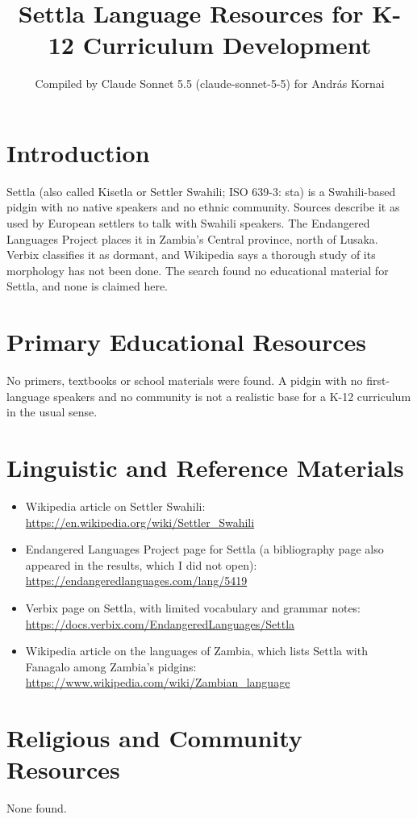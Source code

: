 \documentclass[12pt]{article}
\title{Settla Language Resources for K-12 Curriculum Development}
\author{Compiled by Claude Sonnet 5.5 (claude-sonnet-5-5) for Andr\'as Kornai}
\date{}
\begin{document}
\maketitle

\section{Introduction}
Settla (also called Kisetla or Settler Swahili; ISO 639-3: sta) is a Swahili-based pidgin with no native speakers and no ethnic community. Sources describe it as used by European settlers to talk with Swahili speakers. The Endangered Languages Project places it in Zambia's Central province, north of Lusaka. Verbix classifies it as dormant, and Wikipedia says a thorough study of its morphology has not been done. The search found no educational material for Settla, and none is claimed here.

\section{Primary Educational Resources}
No primers, textbooks or school materials were found. A pidgin with no first-language speakers and no community is not a realistic base for a K-12 curriculum in the usual sense.

\section{Linguistic and Reference Materials}
\begin{itemize}
\item Wikipedia article on Settler Swahili: \url{https://en.wikipedia.org/wiki/Settler_Swahili}
\item Endangered Languages Project page for Settla (a bibliography page also appeared in the results, which I did not open): \url{https://endangeredlanguages.com/lang/5419}
\item Verbix page on Settla, with limited vocabulary and grammar notes: \url{https://docs.verbix.com/EndangeredLanguages/Settla}
\item Wikipedia article on the languages of Zambia, which lists Settla with Fanagalo among Zambia's pidgins: \url{https://www.wikipedia.com/wiki/Zambian_language}
\end{itemize}

\section{Religious and Community Resources}
None found.
\end{document}
